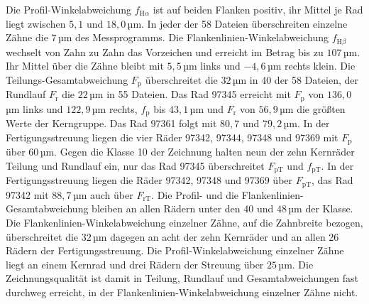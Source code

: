 Die Profil-Winkelabweichung $f_{\mathrm{H}\alpha}$ ist auf beiden Flanken positiv, ihr Mittel je Rad liegt zwischen $5{,}1$ und $18{,}0$\,µm. In jeder der 58 Dateien überschreiten einzelne Zähne die $7$\,µm des Messprogramms. Die Flankenlinien-Winkelabweichung $f_{\mathrm{H}\beta}$ wechselt von Zahn zu Zahn das Vorzeichen und erreicht im Betrag bis zu $107$\,µm. Ihr Mittel über die Zähne bleibt mit $5{,}5$\,µm links und $-4{,}6$\,µm rechts klein. Die Teilungs-Gesamtabweichung $F_{\mathrm{p}}$ überschreitet die $32$\,µm in 40 der 58 Dateien, der Rundlauf $F_{\mathrm{r}}$ die $22$\,µm in 55 Dateien. Das Rad 97345 erreicht mit $F_{\mathrm{p}}$ von $136{,}0$\,µm links und $122{,}9$\,µm rechts, $f_{\mathrm{p}}$ bis $43{,}1$\,µm und $F_{\mathrm{r}}$ von $56{,}9$\,µm die größten Werte der Kerngruppe. Das Rad 97361 folgt mit $80{,}7$ und $79{,}2$\,µm. In der Fertigungsstreuung liegen die vier Räder 97342, 97344, 97348 und 97369 mit $F_{\mathrm{p}}$ über $60$\,µm. Gegen die Klasse 10 der Zeichnung halten neun der zehn Kernräder Teilung und Rundlauf ein, nur das Rad 97345 überschreitet $F_{\mathrm{pT}}$ und $f_{\mathrm{pT}}$. In der Fertigungsstreuung liegen die Räder 97342, 97348 und 97369 über $F_{\mathrm{pT}}$, das Rad 97342 mit $88{,}7$\,µm auch über $F_{\mathrm{rT}}$. Die Profil- und die Flankenlinien-Gesamtabweichung bleiben an allen Rädern unter den $40$ und $48$\,µm der Klasse. Die Flankenlinien-Winkelabweichung einzelner Zähne, auf die Zahnbreite bezogen, überschreitet die $32$\,µm dagegen an acht der zehn Kernräder und an allen 26 Rädern der Fertigungsstreuung. Die Profil-Winkelabweichung einzelner Zähne liegt an einem Kernrad und drei Rädern der Streuung über $25$\,µm. Die Zeichnungsqualität ist damit in Teilung, Rundlauf und Gesamtabweichungen fast durchweg erreicht, in der Flankenlinien-Winkelabweichung einzelner Zähne nicht.

